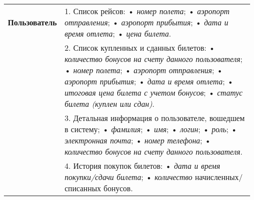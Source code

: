 \begin{longtable}{|p{0.5cm}|p{15.5cm}|}
	\begin{rotatebox}[origin=r]{90}
		{\textbf{Пользователь}}
	\end{rotatebox} 
	& 
	1. Список рейсов: \newline
    • \textit{номер полета}; \newline
    • \textit{аэропорт отправления}; \newline
    • \textit{аэропорт прибытия}; \newline
    • \textit{дата и время отлета}; \newline
    • \textit{цена билета}. \\
	\cline{2-2}
    &
  2. Список купленных и сданных билетов: \newline
    • \textit{количество бонусов на счету данного пользователя}; \newline
    • \textit{номер полета}; \newline
    • \textit{аэропорт отправления}; \newline
    • \textit{аэропорт прибытия}; \newline
    • \textit{дата и время отлета}; \newline
    • \textit{итоговая цена билета с учетом бонусов}; \newline
    • \textit{статус билета (куплен или сдан)}. \\
	\cline{2-2}
    &
  3. Детальная информация о пользователе, вошедшем в систему; \newline
    • \textit{фамилия}; \newline
    • \textit{имя}; \newline
    • \textit{логин}; \newline
    • \textit{роль}; \newline
    • \textit{электронная почта}; \newline
    • \textit{номер телефона}; \newline
    • \textit{количество бонусов на счету данного пользователя}.\\
	\cline{2-2}
	&
	4. История покупок билетов: \newline
    • \textit{дата и время покупки/сдачи билета}; \newline
    • \textit{количество} начисленных/списанных бонусов. \\
    

\end{longtable}
